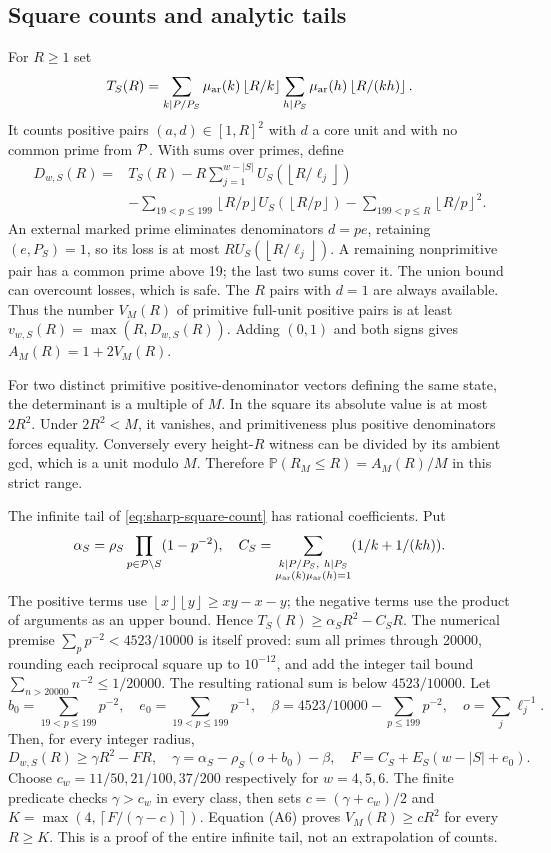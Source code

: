 \documentclass[11pt]{article}
\theoremstyle{definition}\newtheorem{definition}[theorem]{Definition}
\theoremstyle{remark}\newtheorem{remark}[theorem]{Remark}
\newcommand{\Prb}{\mathbb P}
\newcommand{\floor}[1]{\left\lfloor #1\right\rfloor}
\newcommand{\ceil}[1]{\left\lceil #1\right\rceil}
\begin{document}
\subsection{Square counts and analytic tails}
For \(R\ge1\) set
\[
 T_S(R)=
 \sum_{k\mid P/P_S}\mu_{\rm ar}(k)\floor{R/k}
 \sum_{h\mid P_S}\mu_{\rm ar}(h)\floor{R/(kh)} .
\]
It counts positive pairs \((a,d)\in[1,R]^2\) with \(d\) a core unit
and with no common prime from \({\cal P}\).
With sums over primes, define
\[
\begin{split}
 D_{w,S}(R)={}&T_S(R)-R\sum_{j=1}^{w-|S|}
 U_S(\floor{R/\ell_j})\\
 &-\sum_{19<p\le199}\floor{R/p}U_S(\floor{R/p})
 -\sum_{199<p\le R}\floor{R/p}^2 .
\end{split}                                                        \tag{A5}\label{eq:sharp-square-count}
\]
An external marked prime eliminates denominators \(d=pe\), retaining
\((e,P_S)=1\), so its loss is at most \(R U_S(\floor{R/\ell_j})\).
A remaining nonprimitive pair has a common prime above 19; the last
two sums cover it. The union bound can overcount losses, which is safe.
The \(R\) pairs with \(d=1\) are always available. Thus the number
\(V_M(R)\) of primitive full-unit positive pairs is at least
\(v_{w,S}(R)=\max(R,D_{w,S}(R))\).
Adding \((0,1)\) and both signs gives \(A_M(R)=1+2V_M(R)\).

For two distinct primitive positive-denominator vectors defining the same
state, the determinant is a multiple of \(M\).
In the square its absolute value is at most \(2R^2\).
Under \(2R^2<M\), it vanishes, and primitiveness plus positive
denominators forces equality. Conversely every height-\(R\) witness can
be divided by its ambient gcd, which is a unit modulo \(M\).
Therefore \(\Prb(R_M\le R)=A_M(R)/M\) in this strict range.

The infinite tail of \eqref{eq:sharp-square-count} has rational coefficients.
Put
\[
 \alpha_S=\rho_S\prod_{p\in{\cal P}\setminus S}(1-p^{-2}),\quad
 C_S=\sum_{\substack{k\mid P/P_S,\ h\mid P_S\\
 \mu_{\rm ar}(k)\mu_{\rm ar}(h)=1}}
 (1/k+1/(kh)).
\]
The positive terms use
\(\floor x\floor y\ge xy-x-y\); the negative terms use the product
of arguments as an upper bound. Hence \(T_S(R)\ge\alpha_S R^2-C_SR\).
The numerical premise \(\sum_p p^{-2}<4523/10000\) is itself proved:
sum all primes through 20000, rounding each reciprocal square up to
\(10^{-12}\), and add the integer tail bound
\(\sum_{n>20000}n^{-2}\le1/20000\).
The resulting rational sum is below \(4523/10000\).
Let
\[
 b_0=\sum_{19<p\le199}p^{-2},\quad e_0=\sum_{19<p\le199}p^{-1},
 \quad\beta=4523/10000-\sum_{p\le199}p^{-2},\quad o=\sum_j\ell_j^{-1}.
\]
Then, for every integer radius,
\[
 D_{w,S}(R)\ge\gamma R^2-FR,\quad
 \gamma=\alpha_S-\rho_S(o+b_0)-\beta,\quad
 F=C_S+E_S(w-|S|+e_0).                                               \tag{A6}
\]
Choose \(c_w=11/50,21/100,37/200\) respectively for \(w=4,5,6\).
The finite predicate checks \(\gamma>c_w\) in every class, then sets
\(c=(\gamma+c_w)/2\) and
\(K=\max(4,\ceil{F/(\gamma-c)})\).
Equation (A6) proves \(V_M(R)\ge cR^2\) for every \(R\ge K\).
This is a proof of the entire infinite tail, not an extrapolation of counts.
\end{document}

